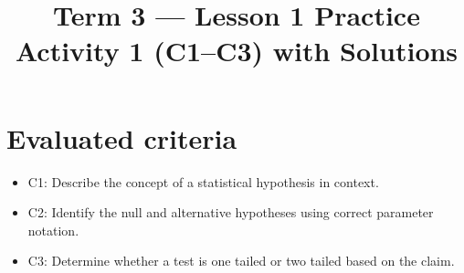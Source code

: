 \makeatletter
{}
\makeatother	



\title{Term 3 — Lesson 1 Practice Activity 1 (C1–C3) with Solutions}
\author{}
\date{}



	\maketitle

	\setcounter{tocdepth}{1}
	\setcounter{secnumdepth}{2}
	\tableofcontents

	\newcommand{\LeftTailGraph}{%
		\begin{center}
		\begin{tikzpicture}[scale=0.55]
		\draw[thin] (-3,0) -- (3,0);
		\fill[gray!35] (-3,0) -- plot[smooth,domain=-3:-1] (\x,{1.6*exp(-0.5*\x*\x)}) -- (-1,0) -- cycle;
		\draw[thick,domain=-3:3,smooth] plot (\x,{1.6*exp(-0.5*\x*\x)});
		\end{tikzpicture}
		\end{center}
	}

	\newcommand{\RightTailGraph}{%
		\begin{center}
		\begin{tikzpicture}[scale=0.55]
		\draw[thin] (-3,0) -- (3,0);
		\fill[gray!35] (1,0) -- plot[smooth,domain=1:3] (\x,{1.6*exp(-0.5*\x*\x)}) -- (3,0) -- cycle;
		\draw[thick,domain=-3:3,smooth] plot (\x,{1.6*exp(-0.5*\x*\x)});
		\end{tikzpicture}
		\end{center}
	}

	\newcommand{\TwoTailGraph}{%
		\begin{center}
		\begin{tikzpicture}[scale=0.55]
		\draw[thin] (-3,0) -- (3,0);
		\fill[gray!35] (-3,0) -- plot[smooth,domain=-3:-1] (\x,{1.6*exp(-0.5*\x*\x)}) -- (-1,0) -- cycle;
		\fill[gray!35] (1,0) -- plot[smooth,domain=1:3] (\x,{1.6*exp(-0.5*\x*\x)}) -- (3,0) -- cycle;
		\draw[thick,domain=-3:3,smooth] plot (\x,{1.6*exp(-0.5*\x*\x)});
		\end{tikzpicture}
		\end{center}
	}
	\section*{Evaluated criteria}
	\begin{itemize}
		\item C1: Describe the concept of a statistical hypothesis in context.
		\item C2: Identify the null and alternative hypotheses using correct parameter notation.
		\item C3: Determine whether a test is one tailed or two tailed based on the claim.
	\end{itemize}
	
